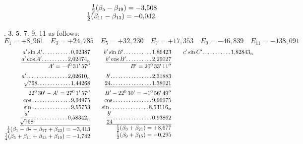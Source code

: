\begin{landscape}
\[\begin{array}{@{}r@{\qquad}r@{\qquad}r@{}}
\begin{array}[t]{@{}r@{}}
\tfrac12(\beta_5-\beta_{19})=-3{,}508\\
\tfrac12(\beta_{11}-\beta_{13})=-0{,}042.
\end{array}
\end{array}
\]
\clearpage{}
\par{}. 3. 5. 7. 9. 11 as follows:
\[E_1=+8{,}961\quad E_3=+24{,}785\quad E_5=+32{,}230\quad E_7=+17{,}353\quad E_9=-46{,}839\quad E_{11}=-138{,}091\]
\[
\begin{array}{@{}r@{\qquad}r@{\qquad}r@{}}
\begin{array}[t]{@{}r@{}}
a'\sin A'\VfourDots{10}0{,}92387\\
\underline{a'\cos A'\VfourDots{9}2{,}02474_n}\\
A'=-4^0\,31'\,57''\\[5pt]
a'\VfourDots{15}2{,}02610_n\\
\underline{\BareRoot{768}\VfourDots{12}1{,}44268}\\[5pt]
22^0\,30'-A'=27^0\,1'\,57''\\
\cos\VfourDots{14}9{,}94975\\
\sin\VfourDots{14}9{,}65753\\
\underline{\dfrac{a'}{\BareRoot{768}}\VfourDots{12}0{,}58342_n}\\[5pt]
\tfrac14(\beta_1-\beta_7-\beta_{17}+\beta_{23})=-3{,}413\\
\tfrac14(\beta_5+\beta_{11}+\beta_{13}+\beta_{19})=-1{,}742
\end{array}
&\begin{array}[t]{@{}r@{}}
b'\sin B'\VfourDots{10}1{,}86423\\
\underline{b'\cos B'\VfourDots{9}2{,}29027}\\
B'=20^0\,33'\,11''\\[5pt]
b'\VfourDots{15}2{,}31883\\
\underline{24\VfourDots{15}1{,}38021}\\[5pt]
B'-22^0\,30'=-1^0\,56'\,49''\\
\cos\VfourDots{14}9{,}99975\\
\sin\VfourDots{14}8{,}53116_n\\
\underline{\dfrac{b'}{24}\VfourDots{14}0{,}93862}\\[5pt]
\tfrac12(\beta_3+\beta_{21})=+8{,}677\\
\tfrac12(\beta_9+\beta_{15})=-0{,}295
\end{array}
&\begin{array}[t]{@{}r@{}}
c'\sin C'\VfourDots{10}1{,}82843_n\\

\end{array}
\end{array}\]
\end{landscape}
